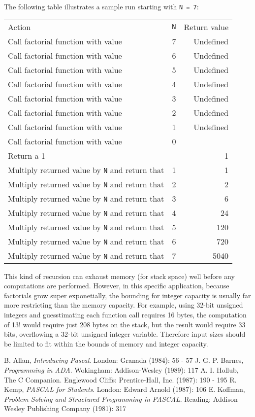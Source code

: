 \documentclass[12pt]{article}
\begin{document}
The following table illustrates a sample run starting with \verb'N = 7':

\begin{tabular}{|l|r|r|}
Action & \verb=N= & Return value \\
Call factorial function with value & 7 & Undefined \\
Call factorial function with value & 6 & Undefined \\
Call factorial function with value & 5 & Undefined \\
Call factorial function with value & 4 & Undefined \\
Call factorial function with value & 3 & Undefined \\
Call factorial function with value & 2 & Undefined \\
Call factorial function with value & 1 & Undefined \\
Call factorial function with value & 0 & \\
Return a 1 & & 1 \\
Multiply returned value by \verb=N= and return that & 1 & 1 \\
Multiply returned value by \verb=N= and return that & 2 & 2 \\
Multiply returned value by \verb=N= and return that & 3 & 6 \\
Multiply returned value by \verb=N= and return that & 4 & 24 \\
Multiply returned value by \verb=N= and return that & 5 & 120 \\
Multiply returned value by \verb=N= and return that & 6 & 720 \\
Multiply returned value by \verb=N= and return that & 7 & 5040 \\
\end{tabular}

This kind of recursion can exhaust memory (for stack space) well before any computations are performed. However, in this specific application, because factorials grow super exponetially, the bounding for integer capacity is usually far more restricting than the memory capacity. For example, using 32-bit unsigned integers and guesstimating each function call requires 16 bytes, the computation of 13! would require just 208 bytes on the stack, but the result would require 33 bits, overflowing a 32-bit unsigned integer variable. Therefore input sizes should be limited to fit within the bounds of memory and integer capacity.


\begin{thebibliography}{5}
 B. Allan, {\it Introducing Pascal}. London: Granada (1984): 56 - 57
 J. G. P. Barnes, {\it Programming in ADA}. Wokingham: Addison-Wesley (1989): 117
 A. I. Hollub, {The C Companion}. Englewood Cliffs: Prentice-Hall, Inc. (1987): 190 - 195
 R. Kemp, {\it PASCAL for Students}. London: Edward Arnold (1987): 106
 E. Koffman, {\it Problem Solving and Structured Programming in PASCAL}. Reading: Addison-Wesley Publishing Company (1981): 317
\end{thebibliography}

\end{document}

